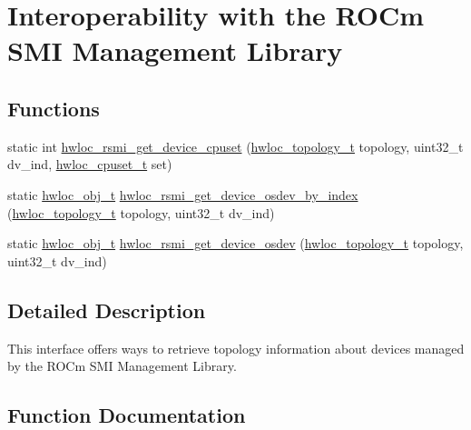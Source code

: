 \hypertarget{a00222}{}\section{Interoperability with the R\+O\+Cm S\+MI Management Library}
\label{a00222}
\subsection*{Functions}
\begin{DoxyCompactItemize}
\item 
static int \hyperlink{a00222_gaf939e697e3769c3524255318262b9c29}{hwloc\+\_\+rsmi\+\_\+get\+\_\+device\+\_\+cpuset} (\hyperlink{a00186_ga9d1e76ee15a7dee158b786c30b6a6e38}{hwloc\+\_\+topology\+\_\+t} topology, uint32\+\_\+t dv\+\_\+ind, \hyperlink{a00183_ga4bbf39b68b6f568fb92739e7c0ea7801}{hwloc\+\_\+cpuset\+\_\+t} set)
\item 
static \hyperlink{a00185_ga79b8ab56877ef99ac59b833203391c7d}{hwloc\+\_\+obj\+\_\+t} \hyperlink{a00222_ga507d0acdd5e9ac374a8d120d59604c80}{hwloc\+\_\+rsmi\+\_\+get\+\_\+device\+\_\+osdev\+\_\+by\+\_\+index} (\hyperlink{a00186_ga9d1e76ee15a7dee158b786c30b6a6e38}{hwloc\+\_\+topology\+\_\+t} topology, uint32\+\_\+t dv\+\_\+ind)
\item 
static \hyperlink{a00185_ga79b8ab56877ef99ac59b833203391c7d}{hwloc\+\_\+obj\+\_\+t} \hyperlink{a00222_gaba05bf9710655bb5b1439bee654340ba}{hwloc\+\_\+rsmi\+\_\+get\+\_\+device\+\_\+osdev} (\hyperlink{a00186_ga9d1e76ee15a7dee158b786c30b6a6e38}{hwloc\+\_\+topology\+\_\+t} topology, uint32\+\_\+t dv\+\_\+ind)
\end{DoxyCompactItemize}


\subsection{Detailed Description}
This interface offers ways to retrieve topology information about devices managed by the R\+O\+Cm S\+MI Management Library. 

\subsection{Function Documentation}
\mbox{\label{a00222_gaf939e697e3769c3524255318262b9c29}} 
